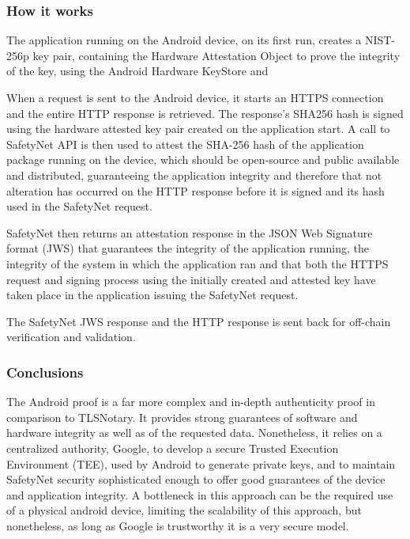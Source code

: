 \subsubsection{How it works}
The application running on the Android device, on its first run, creates a NIST-256p key pair, containing the Hardware Attestation Object to prove the integrity of the key, using the Android Hardware KeyStore and 

When a request is sent to the Android device, it starts an HTTPS connection and the entire HTTP response is retrieved. The response's SHA256 hash is signed using the hardware attested key pair created on the application start. A call to SafetyNet API is then used to attest the SHA-256 hash of the application package running on the device, which should be open-source and public available and distributed, guaranteeing the application integrity and therefore that not alteration has occurred on the HTTP response before it is signed and its hash used in the SafetyNet request.

SafetyNet then returns an attestation response in the JSON Web Signature format (JWS) that guarantees the integrity of the application running, the integrity of the system in which the application ran and that both the HTTPS request and signing process using the initially created and attested key have taken place in the application issuing the SafetyNet request.

The SafetyNet JWS response and the HTTP response is sent back for off-chain verification and validation.

\subsubsection{Conclusions}
The Android proof is a far more complex and in-depth authenticity proof in comparison to TLSNotary. It provides strong guarantees of software and hardware integrity as well as of the requested data. Nonetheless, it relies on a centralized authority, Google, to develop a secure Trusted Execution Environment (TEE), used by Android to generate private keys, and to maintain SafetyNet security sophisticated enough to offer good guarantees of the device and application integrity. A bottleneck in this approach can be the required use of a physical android device, limiting the scalability of this approach, but nonetheless, as long as Google is trustworthy it is a very secure model. 


